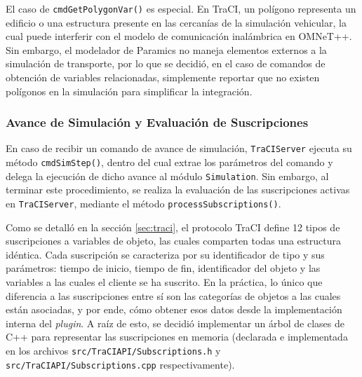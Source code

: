 

El caso de \texttt{cmdGetPolygonVar()} es especial. En TraCI, un polígono representa un edificio o una estructura presente en las cercanías de la simulación vehicular, la cual puede interferir con el modelo de comunicación inalámbrica en OMNeT++. Sin embargo, el modelador de Paramics no maneja elementos externos a la simulación de transporte, por lo que se decidió, en el caso de comandos de obtención de variables relacionadas, simplemente reportar que no existen polígonos en la simulación para simplificar la integración.



\subsubsection{Avance de Simulación y Evaluación de Suscripciones}\label{sec:traciserver_simstep}

En caso de recibir un comando de avance de simulación, \texttt{TraCIServer} ejecuta su método \texttt{cmdSimStep()}, dentro del cual extrae los parámetros del comando y delega la ejecución de dicho avance al módulo \texttt{Simulation}. Sin embargo, al terminar este procedimiento, se realiza la evaluación de las suscripciones activas en \texttt{TraCIServer}, mediante el método \texttt{processSubscriptions()}.

Como se detalló en la sección \ref{sec:traci}, el protocolo TraCI define 12 tipos de suscripciones a variables de objeto, las cuales comparten todas una estructura idéntica. Cada suscripción se caracteriza por su identificador de tipo y sus parámetros: tiempo de inicio, tiempo de fin, identificador del objeto y las variables a las cuales el cliente se ha suscrito. En la práctica, lo único que diferencia a las suscripciones entre sí son las categorías de objetos a las cuales están asociadas, y por ende, cómo obtener esos datos desde la implementación interna del \emph{plugin}. A raíz de esto, se decidió implementar un árbol de clases de C++ para representar las suscripciones en memoria (declarada e implementada en los archivos \texttt{src/TraCIAPI/Subscriptions.h} y \texttt{src/TraCIAPI/Subscriptions.cpp} respectivamente).

